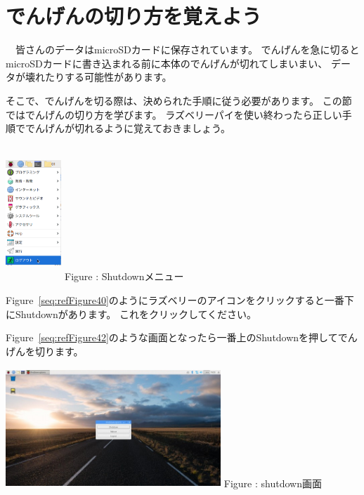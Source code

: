 \documentclass[a4paper,12pt]{jarticle}
\begin{document}
\section{でんげんの切り方を覚えよう}
\ \ 皆さんのデータはmicroSDカードに保存されています。
でんげんを急に切るとmicroSDカードに書き込まれる前に本体のでんげんが切れてしまいまい、
データが壊れたりする可能性があります。

そこで、でんげんを切る際は、決められた手順に従う必要があります。
この節ではでんげんの切り方を学びます。
ラズベリーパイを使い終わったら正しい手順ででんげんが切れるように覚えておきましょう。



\centering
\begin{minipage}{8.115cm}
  {\upshape
    \centering
    \includegraphics[width=2.1cm,height=5.1cm]{textbook-img206.png}
    \newline
    Figure {\theFigure\label{seq:refFigure40}}: Shutdownメニュー}
\end{minipage}
\begin{minipage}{7.115cm}
  Figure~\ref{seq:refFigure40}のようにラズベリーのアイコンをクリックすると一番下にShutdownがあります。
  これをクリックしてください。
\end{minipage}
\bigskip


\flushleft
\textcolor[rgb]{0.13333334,0.13333334,0.13333334}{Figure~\ref{seq:refFigure42}のような画面となったら一番上のShutdownを押してでんげんを切ります。}
\bigskip
\centering
\begin{minipage}{8.225cm}
  {\upshape
    \includegraphics[width=8.1cm,height=4.5cm]{textbook-img208.jpg}
    Figure {\theFigure\label{seq:refFigure42}}: shutdown画面}
\end{minipage}
\end{document}
